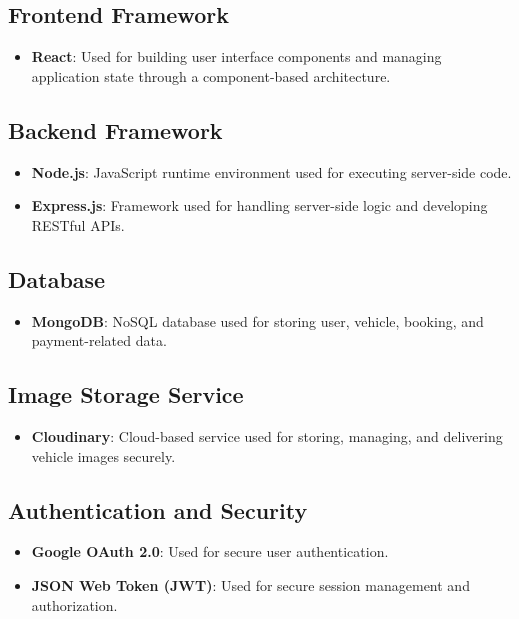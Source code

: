 \documentclass[12pt,a4paper]{report}
\begin{document}
\subsection*{Frontend Framework}
\begin{itemize}
	\item \textbf{React}: Used for building user interface components and managing application state through a component-based architecture.
\end{itemize}

\subsection*{Backend Framework}
\begin{itemize}
	\item \textbf{Node.js}: JavaScript runtime environment used for executing server-side code.
	\item \textbf{Express.js}: Framework used for handling server-side logic and developing RESTful APIs.
\end{itemize}

\subsection*{Database}
\begin{itemize}
	\item \textbf{MongoDB}: NoSQL database used for storing user, vehicle, booking, and payment-related data.
\end{itemize}

\subsection*{Image Storage Service}
\begin{itemize}
	\item \textbf{Cloudinary}: Cloud-based service used for storing, managing, and delivering vehicle images securely.
\end{itemize}

\subsection*{Authentication and Security}
\begin{itemize}
	\item \textbf{Google OAuth 2.0}: Used for secure user authentication.
	\item \textbf{JSON Web Token (JWT)}: Used for secure session management and authorization.
\end{itemize}
\end{document}
